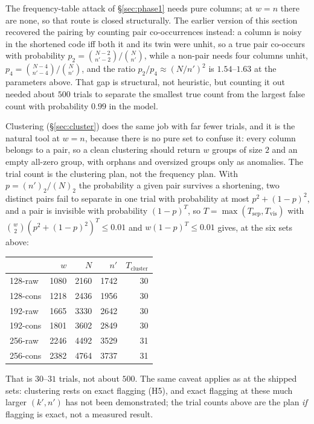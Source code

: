 The frequency-table attack of \S\ref{sec:phase1} needs pure columns; at
$w=n$ there are none, so that route is closed structurally. The
earlier version of this section recovered the pairing by counting
pair co-occurrences instead: a column is noisy in the shortened
code iff both it and its twin were unhit, so a true pair co-occurs
with probability $p_2 = \binom{N-2}{n'-2}/\binom{N}{n'}$, while a
non-pair needs four columns unhit, $p_4 =
\binom{N-4}{n'-4}/\binom{N}{n'}$, and the ratio $p_2/p_4 \approx
(N/n')^2$ is $1.54$--$1.63$ at the parameters above. That gap is
structural, not heuristic, but counting it out needed about $500$
trials to separate the smallest true count from the largest false
count with probability $0.99$ in the model.

Clustering (\S\ref{sec:cluster}) does the same job with far
fewer trials, and it is the natural tool at $w=n$, because there
is no pure set to confuse it: every column belongs to a pair, so
a clean clustering should return $w$ groups of size $2$ and an
empty all-zero group, with orphans and oversized groups only as
anomalies. The trial count is the clustering plan, not the
frequency plan. With $p = (n')_2/(N)_2$ the probability a given
pair survives a shortening, two distinct pairs fail to separate
in one trial with probability at most $p^2 + (1-p)^2$, and a pair
is invisible with probability $(1-p)^T$, so
$T = \max(T_{\mathrm{sep}}, T_{\mathrm{vis}})$ with
$\binom{w}{2}(p^2 + (1-p)^2)^T \le 0.01$ and
$w(1-p)^T \le 0.01$ gives, at the six sets above:

\begin{center}
    \begin{tabular}{lrrrr}
        \toprule
                 & $w$  & $N$  & $n'$ & $T_{\mathrm{cluster}}$ \\
        \midrule
        128-raw  & 1080 & 2160 & 1742 & 30 \\
        128-cons & 1218 & 2436 & 1956 & 30 \\
        192-raw  & 1665 & 3330 & 2642 & 30 \\
        192-cons & 1801 & 3602 & 2849 & 30 \\
        256-raw  & 2246 & 4492 & 3529 & 31 \\
        256-cons & 2382 & 4764 & 3737 & 31 \\
        \bottomrule
    \end{tabular}
\end{center}

That is $30$--$31$ trials, not about $500$. The same caveat
applies as at the shipped sets: clustering rests on exact
flagging (H5), and exact flagging at these much larger
$(k', n')$ has not been demonstrated; the trial counts above
are the plan \emph{if} flagging is exact, not a measured
result.

